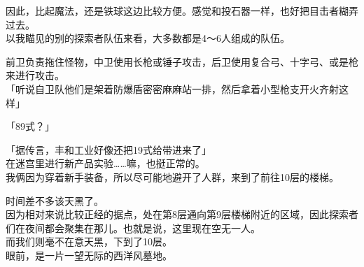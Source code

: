 因此，比起魔法，还是铁球这边比较方便。感觉和投石器一样，也好把目击者糊弄过去。\\

以我瞄见的别的探索者队伍来看，大多数都是4～6人组成的队伍。

前卫负责拖住怪物，中卫使用长枪或锤子攻击，后卫使用复合弓、十字弓、或是枪来进行攻击。\\

「听说自卫队他们是架着防爆盾密密麻麻站一排，然后拿着小型枪支开火齐射这样」

「89式？」

「据传言，丰和工业好像还把19式给带进来了」\\

在迷宫里进行新产品实验……嘛，也挺正常的。\\

我俩因为穿着新手装备，所以尽可能地避开了人群，来到了前往10层的楼梯。

时间差不多该天黑了。\\

因为相对来说比较正经的据点，处在第8层通向第9层楼梯附近的区域，因此探索者们在夜间都会聚集在那儿。也就是说，这里现在空无一人。\\

而我们则毫不在意天黑，下到了10层。\\

% 


眼前，是一片一望无际的西洋风墓地。\\

